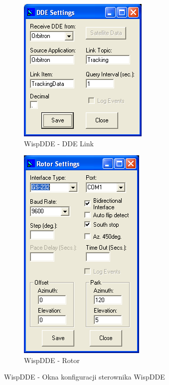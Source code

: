 \documentclass[eng,oneside]{mgr}
\begin{document}
			\begin{figure}[!htb]
				\centering
				\begin{subfigure}[b]{0.4\textwidth}
					\includegraphics[scale=0.7]{screen4}
					\caption{WispDDE - DDE Link}
					\label{fig:WispDDE_DDE_Link_settings}
				\end{subfigure}
				\begin{subfigure}[b]{0.4\textwidth}
					\begin{center}
						\includegraphics[scale=0.7]{screen5}
						\caption{WispDDE - Rotor}
						\label{fig:WispDDE_Rotor_settings}
					\end{center}
				\end{subfigure}
				\caption{WispDDE - Okna konfiguracji sterownika WispDDE}
			\end{figure}
\end{document}
